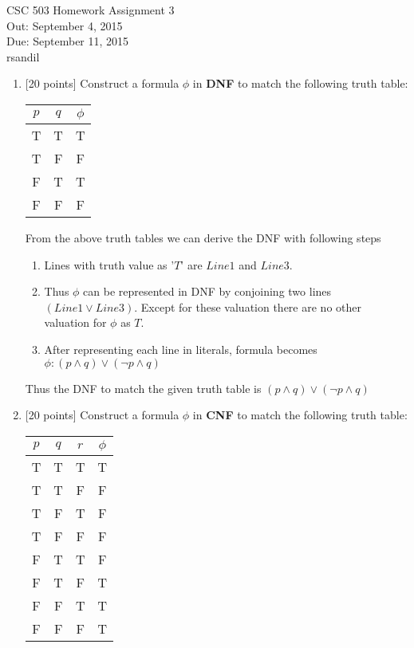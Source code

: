 \documentclass{article}
\def\unityid{rsandil}
\begin{document}
\begin{center}
  {\LARGE CSC 503 Homework Assignment 3}\\[1pc]
  Out: September 4, 2015 \\
  Due: September 11, 2015 \\
  \unityid
\end{center}

\begin{enumerate}

\item {[20 points]} Construct a formula $\phi$ in \textbf{DNF} to
  match the following truth table:
  \begin{center}
    \begin{tabular}{cc|c}
      $p$ & $q$ & $\phi$ \\ \hline
      T & T & T \\
      T & F & F \\
      F & T & T \\
      F & F & F
    \end{tabular}
  \end{center}
  
    \begin{answer}
  	From the above truth tables we can derive the DNF with following steps
  	\begin{enumerate}
  	  \item Lines with truth value as '$T$' are $Line1$ and $Line3$.
  	  \item Thus $\phi$ can be represented in DNF by conjoining two lines  $(Line1 \lor Line3)$. Except for these valuation there are no other valuation for $\phi$ as $T$.
  	  \item After representing each line in literals, formula becomes $\phi : (p \land q) \lor (\neg p
  	  \land q)$
	\end{enumerate}
	
	Thus the DNF to match the given truth table is $(p \land q) \lor (\neg p
  	  \land q)$
  \end{answer}

\item {[20 points]} Construct a formula $\phi$ in \textbf{CNF} to
  match the following truth table:
  \begin{center}
    \begin{tabular}{ccc|c}
      $p$ & $q$ & $r$ & $\phi$ \\ \hline
      T & T & T & T\\
      T & T & F & F\\
      T & F & T & F\\
      T & F & F & F\\
      F & T & T & F\\
      F & T & F & T\\
      F & F & T & T\\
      F & F & F & T
    \end{tabular}
  \end{center}
  

\end{enumerate}
\end{document}
